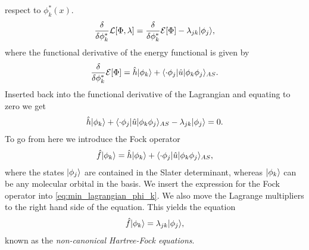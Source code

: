             respect to $\phi_k^{*}(x)$.
            \begin{align}
                \frac{\delta }{\delta \phi_k^{*}}\mathcal{L}[\Phi, \lambda]
                = \frac{\delta }{\delta \phi_k^{*}}\mathcal{E}[\Phi]
                - \lambda_{jk}| \phi_{j} \rangle,
            \end{align}
            where the functional derivative of the energy functional is given by
            \begin{align}
                \frac{\delta }{\delta \phi_k^{*}}\mathcal{E}[\Phi]
                = \hat{h}| \phi_k \rangle
                + \langle \cdot\phi_j |\hat{u}| \phi_k\phi_j \rangle_{AS}.
            \end{align}
            Inserted back into the functional derivative of the Lagrangian and
            equating to zero we get
            \begin{gather}
                \hat{h}| \phi_k \rangle
                + \langle \cdot\phi_j |\hat{u}| \phi_k\phi_j \rangle_{AS}
                - \lambda_{jk}| \phi_{j} \rangle = 0.
                \label{eq:min_lagrangian_phi_k}
            \end{gather}
            To go from here we introduce the Fock operator
            \begin{align}
                \hat{f}| \phi_k \rangle
                = \hat{h}| \phi_k \rangle
                + \langle \cdot\phi_j |\hat{u}| \phi_k\phi_j \rangle_{AS},
            \end{align}
            where the states $| \phi_j \rangle$ are contained in the Slater determinant,
            whereas $| \phi_k \rangle$ can be any molecular orbital in the basis.
            We insert the expression for the Fock operator into
            \autoref{eq:min_lagrangian_phi_k}.
            We also move the Lagrange multipliers to the right hand side of the
            equation.
            This yields the equation
            \begin{align}
                \hat{f}| \phi_k \rangle = \lambda_{jk}| \phi_j \rangle,
                \label{eq:non-canonical-hartree-fock}
            \end{align}
            known as the \emph{non-canonical Hartree-Fock equations}.

